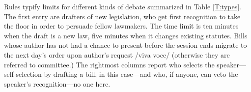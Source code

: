 \documentclass[letter,12pt]{article}
\begin{document}


Rules typify limits for different kinds of debate summarized in Table \ref{T:types}. The first entry are drafters of new legislation, who get first recognition to take the floor in order to persuade fellow lawmakers. The time limit is ten minutes when the draft is a new law, five minutes when it changes existing statutes. Bills whose author has not had a chance to present before the session ends migrate to the next day's order upon author's request /viva voce/ (otherwise they are referred to committee.) The rightmost columns report who selects the speaker---self-selection by drafting a bill, in this case---and who, if anyone, can veto the speaker's recognition---no one here. %
\end{document}
